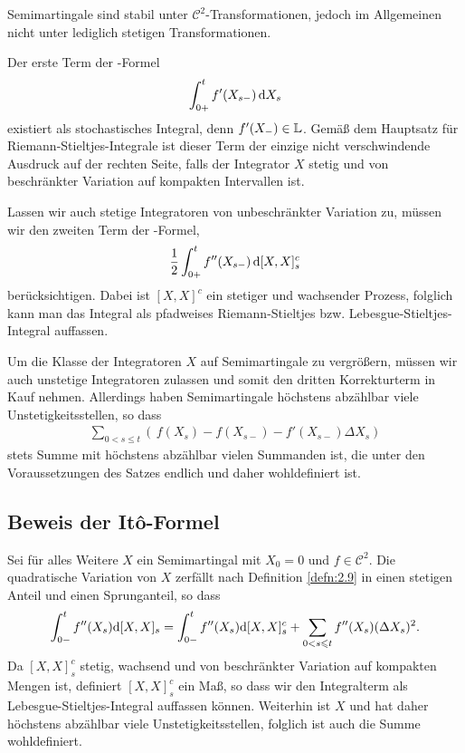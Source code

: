 \begin{rem*}[Bemerkungen.]
\begin{remenum}
\item Semimartingale sind stabil unter $\mathcal{C}^2$-Transformationen, jedoch
im Allgemeinen nicht unter lediglich stetigen Transformationen.
\item Der erste Term der \Ito-Formel
\begin{align*}
\int_{0+}^t f'(X_{s-})\,\mathrm{d} X_s
\end{align*}
existiert als stochastisches Integral, denn $f'(X_{-})\in\mathbb{L}$. Gemäß dem
Hauptsatz für Riemann-Stieltjes-Integrale ist dieser Term der einzige nicht
verschwindende Ausdruck auf der rechten Seite, falls der Integrator $X$
stetig und von beschränkter Variation auf kompakten Intervallen ist.

Lassen wir auch stetige Integratoren von unbeschränkter Variation zu, müssen wir
den zweiten Term der \Ito-Formel,
\begin{align*}
\frac{1}{2} \int_{0+}^t f''(X_{s-})\,
  \mathrm{d}[X,X]_s^c
\end{align*}
berücksichtigen. Dabei ist $[X,X]^c$ ein stetiger und wachsender Prozess,
folglich kann man das Integral als pfadweises Riemann-Stieltjes bzw.
Lebesgue-Stieltjes-Integral auffassen.

Um die Klasse der Integratoren $X$ auf Semimartingale zu vergrößern, müssen wir
auch unstetige Integratoren zulassen und somit den dritten Korrekturterm in
Kauf nehmen. Allerdings haben Semimartingale höchstens abzählbar viele
Unstetigkeitsstellen, so dass
\begin{align*}
\sum_{0<s\le t} \left(\,f(X_s)-f(X_{s-}) -f'(X_{s-}) \Delta
  X_s\right)
\end{align*}
stets Summe mit höchstens abzählbar vielen Summanden ist, die unter den
Voraussetzungen des Satzes endlich und daher wohldefiniert ist.\map
\end{remenum}
\end{rem*}

\subsection{Beweis der Itô-Formel}

Sei für alles Weitere $X$ ein Semimartingal mit $X_0 = 0$ und $f\in
\mathcal{C}^2$. Die quadratische Variation von $X$ zerfällt nach Definition
\ref{defn:2.9} in einen stetigen Anteil und einen Sprunganteil, so dass
\begin{align*}
\int_{0-}^t f''(X_s)\mathrm{d}[X,X]_s 
=
\int_{0-}^t f''(X_s)\mathrm{d}[X,X]_s^c
+
\sum_{0< s\leqslant t} f''(X_s)(\Delta X_s)^2. 
\end{align*}
Da $[X,X]_s^c$ stetig, wachsend und von beschränkter Variation auf kompakten
Mengen ist, definiert $[X,X]_s^c$ ein Maß, so dass wir den Integralterm als
Lebesgue-Stieltjes-Integral auffassen können. Weiterhin ist $X$ \cadlag und hat
daher höchstens abzählbar viele Unstetigkeitsstellen, folglich ist auch die
Summe wohldefiniert.

